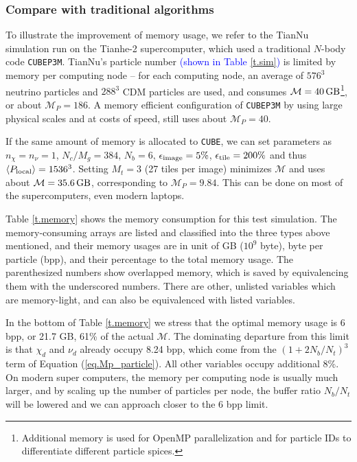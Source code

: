 \documentclass[10pt,twocolumn,preprint]{emulateapj}
\newcommand{\tcb}{\textcolor{blue}}
\begin{document}
\subsubsection{Compare with traditional algorithms}
To illustrate the improvement of memory usage, we refer to the TianNu simulation \citep{2017NatAs...1E.143Y} run on the Tianhe-2 supercomputer, which used a traditional $N$-body code {\tt CUBEP3M}. TianNu's particle number \tcb{(shown in Table \ref{t.sim})} is limited by memory per computing node -- for each computing node, an average of $576^3$ neutrino particles and $288^3$ CDM particles are used, and consumes $\mathcal{M}=40\,{\rm GB}$\footnote{Additional memory is used for OpenMP parallelization and for particle IDs to differentiate different particle spices.}, or about $\mathcal{M}_P=186$. A memory efficient configuration of {\tt CUBEP3M} by using large physical scales and at costs of speed, still uses about $\mathcal{M}_P=40$.

If the same amount of memory is allocated to {\tt CUBE}, we can set parameters as $n_\chi=n_\nu=1$, $N_c/M_g=384$, $N_b=6$, $\epsilon_{\rm image}=5\%$, $\epsilon_{\rm tile}=200\%$ and thus $\left\langle P_{\rm local}\right\rangle=1536^3$. Setting $M_t=3$ (27 tiles per image) minimizes $\mathcal{M}$ and uses about $\mathcal{M}=35.6\,{\rm GB}$, corresponding to $\mathcal{M}_P=9.84$. This can be done on most of the supercomputers, even modern laptops.

Table \ref{t.memory} shows the memory consumption for this test simulation. The memory-consuming arrays are listed and classified into the three types above mentioned, and their memory usages are in unit of GB ($10^9$ byte), byte per particle (bpp), and their percentage to the total memory usage. The parenthesized numbers show overlapped memory, which is saved by equivalencing them with the underscored numbers. There are other, unlisted variables which are memory-light, and can also be equivalenced with listed variables. 

In the bottom of Table \ref{t.memory} we stress that the optimal memory usage is 6 bpp, or 21.7 GB, 61\% of the actual $\mathcal{M}$. The dominating departure from this limit is that $\chi_d$ and $\nu_d$ already occupy 8.24 bpp, which come from the $(1+2N_b/N_t)^3$ term of Equation (\ref{eq.Mp_particle}). All other variables occupy additional 8\%. On modern super computers, the memory per computing node is usually much larger, and by scaling up the number of particles per node, the buffer ratio $N_b/N_t$ will be lowered and we can approach closer to the 6 bpp limit.
\end{document}
